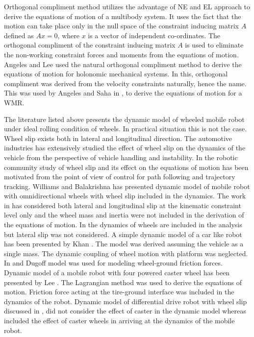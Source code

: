 Orthogonal compliment method utilizes the advantage of NE and EL approach to derive the equations of motion of  a multibody  system.  It uses the fact that the motion can take place only in the null space of the constraint inducing matrix $A$ defined as $Ax=0$, where $x$ is a vector of independent co-ordinates. The orthogonal compliment of the constraint inducing matrix $A$ is used to eliminate the non-working constraint  forces  and moments from the equations of motion.  Angeles and Lee \cite{angeles1988formulation} used the natural orthogonal compliment method to derive the equations of motion for holonomic mechanical systems. In this,  orthogonal compliment was derived from the velocity constraints naturally, hence the name. This was  used by Angeles \cite{angeles2013fundamentals} and Saha in \cite{saha1989kinematics},\cite{saha1991dynamics} to derive the equations of motion for a WMR. 

  The literature listed above presents the dynamic model of wheeled mobile robot under ideal rolling condition of wheels. In practical situation this is not the case.  Wheel slip exists both in lateral and longitudinal direction. The automotive industries  has extensively studied the effect of wheel slip on the dynamics of the vehicle from the perspective of vehicle handling and instability. In the robotic community study of wheel slip and its effect on the equations of motion has been motivated from the point of view of control for path following  and trajectory tracking.  Williams \cite{williams2002dynamic}  and Balakrishna  \cite{balakrishna1995modeling} has presented dynamic model of mobile robot with omnidirectional wheels with wheel slip included in the dynamics. The work in  \cite{williams2002dynamic} has considered both lateral and longitudinal slip at the kinematic  constraint level only and  the wheel mass and inertia were not included in the derivation of the equations of motion. In \cite{balakrishna1995modeling}   the dynamics of  wheels are included in the analysis but lateral slip  was not considered. A simple dynamic model of a car like robot has been presented by Khan \cite{khan2015longitudinal}. The model was derived assuming the  vehicle as a single mass. The dynamic coupling of wheel motion with platform was neglected. In \cite{balakrishna1995modeling} and \cite{khan2015longitudinal}   Dugoff model \cite{dakhlallah2008tire} was used for modeling wheel-ground friction forces. Dynamic model of a mobile robot with four powered caster wheel has been presented by Lee \cite{liu2010dynamic}. The Lagrangian method was used to derive the equations of motion. Friction force acting at the tire-ground interface was included in the dynamics of the robot.  Dynamic model of differential drive robot with wheel slip discussed in \cite{tian2009modeling},\cite{sidek2008dynamic} did not  consider the effect of caster in the dynamic model whereas \cite{konduri2014effect} included the effect of caster wheels in arriving at the dynamics of the mobile robot.
  
